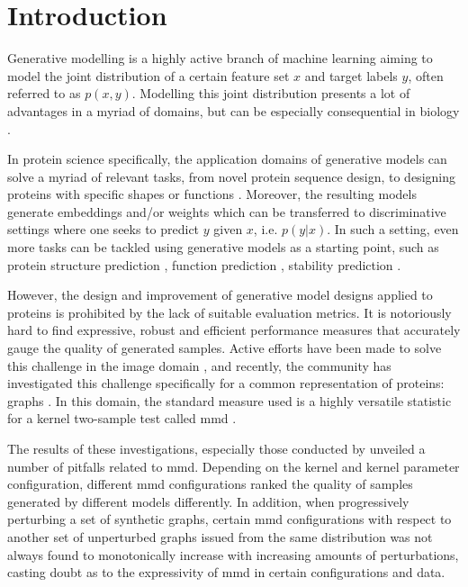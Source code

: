 \chapter{Introduction}


Generative modelling is a highly active branch of machine learning aiming to
model the joint distribution of a certain feature set $x$ and target labels $y$,
often referred to as $p(x,y)$. Modelling this joint distribution presents a lot
of advantages in a myriad of domains, but can be especially
consequential in biology \citep{lopez2020enhancing,strokach2022deep}.

In protein science specifically, the application domains of generative models
can solve a myriad of relevant tasks, from novel protein sequence design, to
designing proteins with specific shapes or functions
\citep{jendrusch2021alphadesign,madani2021deep}. Moreover, the resulting models generate
embeddings and/or weights which can be transferred to discriminative settings
where one seeks to predict $y$ given $x$, i.e. $p(y|x)$. In such a setting, even
more tasks can be tackled using generative models as a starting point, such as protein
structure prediction \citep{jumper2021highly}, function prediction
\citep{meier2021language}, stability prediction \citep{strokach2020fast}.

However, the design and improvement of generative model designs applied to
proteins is prohibited by the lack of suitable evaluation metrics. It is
notoriously hard to find expressive, robust and efficient performance measures
that accurately gauge the quality of generated samples. Active efforts have been
made to solve this challenge in the image domain \citep{heusel2017gans}, and
recently, the community has investigated this challenge specifically for a
common representation of proteins: graphs \citep{thompson2022evaluation,
o2021evaluation}. In this domain, the standard measure used is a highly
versatile statistic for a kernel two-sample test called \acrfull{mmd}
\citep{gretton2012kernel}.

The results of these investigations, especially those conducted by
\cite{o2021evaluation} unveiled a number of pitfalls related to \acrshort{mmd}. Depending
on the kernel and kernel parameter configuration, different \acrshort{mmd} configurations
ranked the quality of samples generated by different models differently. In
addition, when progressively perturbing a set of synthetic graphs, certain \acrshort{mmd}
configurations with respect to another set of unperturbed graphs issued from the
same distribution was not always found to monotonically increase with increasing
amounts of perturbations, casting doubt as to the expressivity of \acrshort{mmd} in certain
configurations and data.


